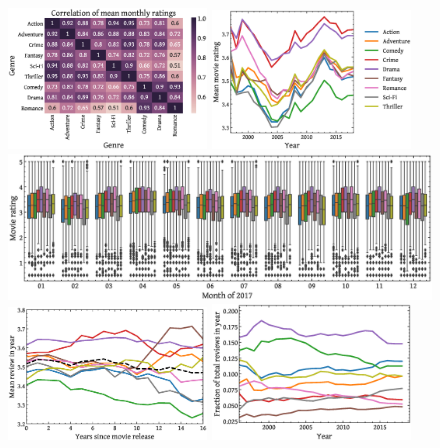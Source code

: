 \documentclass[dvipsnames]{article}
\begin{document}
\begin{figure}
    \centering
    \includegraphics[width=0.47\textwidth]{hm.eps}
    \includegraphics[width=0.47\textwidth]{ty.eps}\\
    \includegraphics[width=\textwidth]{mp.eps}\\
    \includegraphics[width=0.47\textwidth]{mvy.eps}
    \includegraphics[width=0.47\textwidth]{fpy.eps}

\end{figure}
\end{document}
